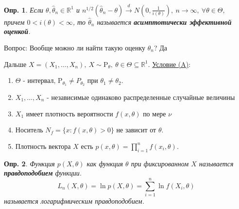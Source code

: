 \documentclass[12pt]{article}
\newtheorem{definition}{Опр.}
\theoremstyle{basic_theorem}
\theoremstyle{name_theorem}
\newcommand\defin[1]{\textbf{#1}}
\def\R{
    \mathbb{R}
}
\def\P{
    \mathrm{P}
}
\begin{document}
    \begin{definition}
        Если $\theta, \hat{\theta}_n \in \R^1$ и $n^{1/2}(\hat{\theta}_n - \theta)\xrightarrow{d} N(0, \frac{1}{i(\theta)}),
        \ n \rightarrow \infty, \ \forall \theta \in \Theta,$
        причем $0 < i(\theta) < \infty$, то $\hat{\theta}_n$ называется \defin{асимптотически 
        эффективной оценкой}.
    \end{definition}
    Вопрос: Вообще можно ли найти такую оценку $\hat{\theta}_n$? Да
    
    \newpage
    
    Дальше $X = (X_1, \ldots, X_n), \ X \sim \P_\theta,\ \theta \in \Theta \subseteq \R^1$.
    \underline{Условие (A)}:
    \begin{enumerate}
        \item $\Theta$ - интервал, $\P_{\theta_1} \neq P_{\theta_2}$ при $\theta_1 \neq \theta_2$.
        \item $X_1, \ldots, X_n$ - независимые одинаково распределенные случайные величины
        \item $X_1$ имеет плотность вероятности $f(x, \theta)$ по мере $\nu$
        \item Носитель $N_f = \{x: f(x, \theta) > 0\}$ не зависит от $\theta$.
        \item Плотность вектора $X$ есть $p(x, \theta) = \prod_{i=1}^n f(x_i, \theta)$.
    \end{enumerate}
    \begin{definition}
    Функция $p(X, \theta)$ как функция $\theta$ при фиксированном $X$ называется
    \defin{правдоподобием} функции.
    $$L_n(X, \theta) = \ln p(X, \theta) = \sum_{i=1}^n \ln f(X_i, \theta)$$ 
    называется логарифмическим правдоподобием.
    \end{definition}
\end{document}
